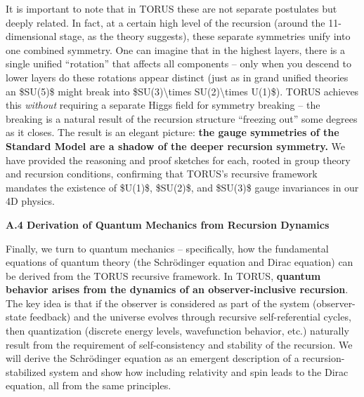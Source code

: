 \documentclass[]{article}
\begin{document}
It is important to note that in TORUS these are not separate postulates
but deeply related. In fact, at a certain high level of the recursion
(around the 11-dimensional stage, as the theory suggests), these
separate symmetries unify into one combined symmetry​. One can imagine
that in the highest layers, there is a single unified ``rotation'' that
affects all components -- only when you descend to lower layers do these
rotations appear distinct (just as in grand unified theories an
\$SU(5)\$ might break into \$SU(3)\textbackslash{}times
SU(2)\textbackslash{}times U(1)\$). TORUS achieves this \emph{without}
requiring a separate Higgs field for symmetry breaking -- the breaking
is a natural result of the recursion structure ``freezing out'' some
degrees as it closes​. The result is an elegant picture: \textbf{the
gauge symmetries of the Standard Model are a shadow of the deeper
recursion symmetry.} We have provided the reasoning and proof sketches
for each, rooted in group theory and recursion conditions, confirming
that TORUS's recursive framework mandates the existence of \$U(1)\$,
\$SU(2)\$, and \$SU(3)\$ gauge invariances in our 4D physics.

\textbf{A.4 Derivation of Quantum Mechanics from Recursion Dynamics}

Finally, we turn to quantum mechanics -- specifically, how the
fundamental equations of quantum theory (the Schrödinger equation and
Dirac equation) can be derived from the TORUS recursive framework. In
TORUS, \textbf{quantum behavior arises from the dynamics of an
observer-inclusive recursion}. The key idea is that if the observer is
considered as part of the system (observer-state feedback) and the
universe evolves through recursive self-referential cycles, then
quantization (discrete energy levels, wavefunction behavior, etc.)
naturally result from the requirement of self-consistency and stability
of the recursion. We will derive the Schrödinger equation as an emergent
description of a recursion-stabilized system and show how including
relativity and spin leads to the Dirac equation, all from the same
principles.
\end{document}
